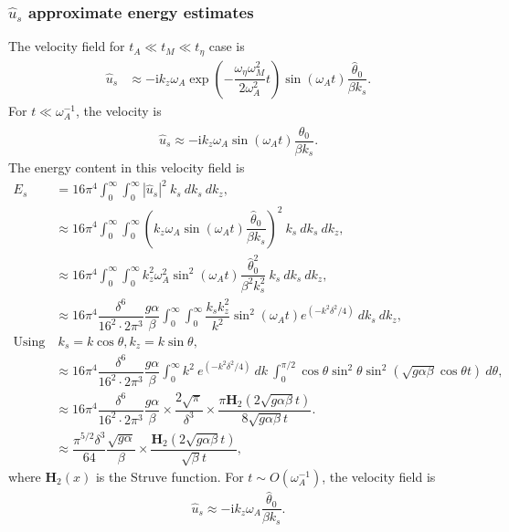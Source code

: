 \documentclass[12pt,psfig]{article}
\begin{document}
\subsubsection{$\hat{u}_s$ approximate energy estimates}
The velocity field for $t_A\ll t_M \ll t_\eta$ case is
\begin{align*}
\hat{u}_s&\approx -\mathrm{i}k_z \omega_A \exp\left(-\dfrac{\omega_\eta\omega_M^2}{2\omega_A^2}t\right)\sin(\omega_A t)\dfrac{\hat{\theta}_0}{\beta k_s}.
\end{align*}
For $t\ll \omega_A^{-1}$, the velocity is
\begin{align*}
\hat{u}_s\approx -\mathrm{i}k_z\omega_A\sin(\omega_A t)\dfrac{\hat{\theta}_0}{\beta k_s}.
\end{align*}
The energy content in this velocity field is
\begin{align*}
E_{s}&= 16\pi^4\int_{0}^{\infty}\int_{0}^{\infty}|\hat{u}_s|^2 \ k_s \ dk_s \ dk_z, \\
&\approx 16\pi^4\int_{0}^{\infty}\int_{0}^{\infty}\left(k_z\omega_A\sin(\omega_A t)\dfrac{\hat{\theta}_0}{\beta k_s}\right)^2 \ k_s \ dk_s \ dk_z, \\
&\approx 16\pi^4\int_{0}^{\infty}\int_{0}^{\infty}k_z^2\omega_A^2\sin^2(\omega_A t)\dfrac{\hat{\theta}^2_0}{\beta^2 k_s^2} \ k_s \ dk_s \ dk_z, \\
&\approx 16\pi^4\dfrac{\delta^6}{16^2\cdot 2\pi^3}\dfrac{g\alpha}{\beta }\int_{0}^{\infty}\int_{0}^{\infty}\dfrac{k_sk_z^2}{k^2}\sin^2(\omega_A t)e^{(-k^2\delta^2/4)} \ dk_s \ dk_z, \\
\text{Using}& \ k_s=k\cos\theta, k_z=k\sin\theta,\\
&\approx 16\pi^4\dfrac{\delta^6}{16^2\cdot 2\pi^3}\dfrac{g\alpha}{\beta }\int_{0}^{\infty}k^2\ e^{(-k^2\delta^2/4)}  \ dk \ \int_{0}^{\pi/2}\cos\theta \sin^2\theta\sin^2(\sqrt{g\alpha\beta}\cos\theta t) \ d\theta, \\
&\approx 16\pi^4\dfrac{\delta^6}{16^2\cdot 2\pi^3}\dfrac{g\alpha}{\beta }\times \dfrac{2\sqrt{\pi}}{\delta^3}\times \dfrac{\pi  \pmb{H}_2(2 \sqrt{g\alpha\beta} t)}{8 \sqrt{g\alpha\beta} t}. \\
&\approx \dfrac{\pi^{5/2}\delta^3}{64}\dfrac{\sqrt{g\alpha}}{\beta }\times \dfrac{ \pmb{H}_2(2 \sqrt{g\alpha\beta} t)}{ \sqrt{\beta} t},
\end{align*}
where $\pmb{H}_2(x)$ is the Struve function.
For $t\sim O(\omega_A^{-1})$, the velocity field is
\begin{align*}
\hat{u}_s\approx -\mathrm{i}k_z\omega_A\dfrac{\hat{\theta}_0}{\beta k_s}.
\end{align*}
\end{document}
